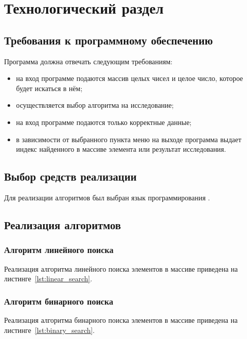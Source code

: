 \chapter{Технологический раздел}
\section{Требования к программному обеспечению}
Программа должна отвечать следующим требованиям:
\begin{itemize}
	\item на вход программе подаются массив целых чисел и целое число, которое будет искаться в нём;
	\item осуществляется выбор алгоритма на исследование;
	\item на вход программе подаются только корректные данные;
	\item в зависимости от выбранного пункта меню на выходе программа выдает индекс найденного в массиве элемента или результат исследования.
\end{itemize}

\section{Выбор средств реализации}
Для реализации алгоритмов был выбран язык программирования .

\section{Реализация алгоритмов}
\subsection{Алгоритм линейного поиска}
Реализация алгоритма линейного поиска элементов в массиве приведена на листинге~\ref{lst:linear_search}.


\subsection{Алгоритм бинарного поиска}
Реализация алгоритма бинарного поиска элементов в массиве приведена на листинге~\ref{lst:binary_search}.


